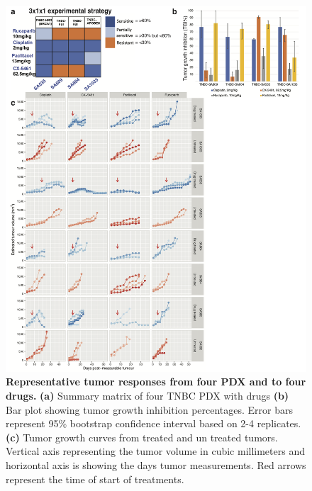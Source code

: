\begin{figure}
\centering
	\includegraphics[width=\textwidth]{Figures/chap3/4drugs4PDXNew.png}
	\caption[Representative tumor responses from four PDX and  to four drugs]
	{\small
	   \textbf{Representative tumor responses from four PDX and  to four drugs.}
	    \textbf{(a)} Summary matrix of four TNBC PDX with drugs
	     \textbf{(b)} Bar plot showing tumor growth inhibition percentages. Error bars represent 95\% bootstrap confidence interval based on 2-4 replicates.
	    \textbf{(c)} Tumor growth curves from treated and un treated tumors. Vertical axis representing the tumor volume in cubic millimeters and horizontal axis is showing the days tumor measurements. Red arrows represent the time of start of treatments.
}
	\label{fig:invivo}
\end{figure}



